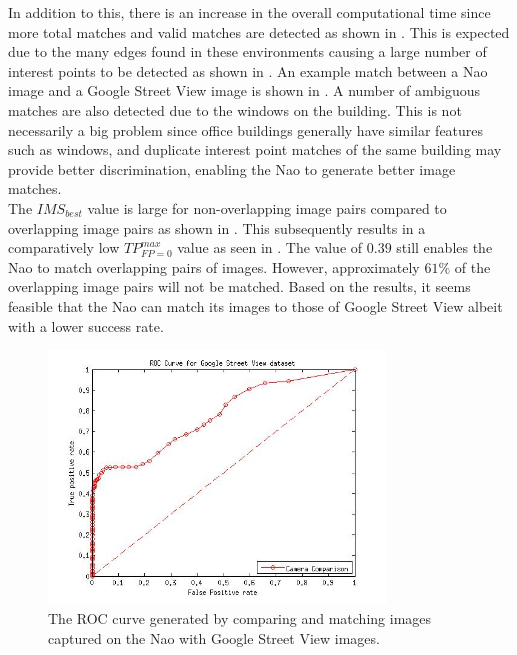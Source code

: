 In addition to this, there is an increase in the overall computational time since more total matches and valid matches are detected as shown in . This is expected due to the many edges found in these environments causing a large number of interest points to be detected as shown in . An example match between a Nao image and a Google Street View image is shown in . A number of ambiguous matches are also detected due to the windows on the building. This is not necessarily a big problem since office buildings generally have similar features such as windows, and duplicate interest point matches of the same building may provide better discrimination, enabling the Nao to generate better image matches.\\

The $IMS_{best}$ value is large for non-overlapping image pairs compared to overlapping image pairs as shown in . This subsequently results in a comparatively low $TP_{FP=0}^{max}$ value as seen in . The value of $0.39$ still enables the Nao to match overlapping pairs of images. However, approximately $61\%$ of the overlapping image pairs will not be matched. Based on the results, it seems feasible that the Nao can match its images to those of Google Street View albeit with a lower success rate.\\

 \begin{figure}[h!] 
  \centering
    \includegraphics[width=0.8\textwidth]{../Drawings/streetView/ROC_StreetView.jpg}
    \caption{The ROC curve generated by comparing and matching images captured on the Nao with Google Street View images.}
    \label{fig:rocGoogleStreet}
\end{figure}

